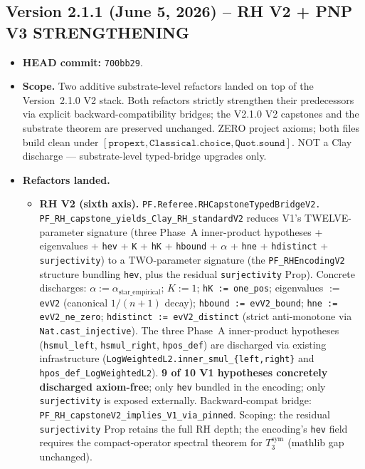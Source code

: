 \subsection*{Version 2.1.1 (June 5, 2026) -- RH V2 + PNP V3 STRENGTHENING}
\begin{itemize}
\item \textbf{HEAD commit:} \texttt{700bb29}.
\item \textbf{Scope.} Two additive substrate-level refactors landed on
top of the Version~2.1.0 V2 stack. Both refactors strictly
strengthen their predecessors via explicit backward-compatibility
bridges; the V2.1.0 V2 capstones and the substrate theorem are
preserved unchanged. ZERO project axioms; both files build clean
under $[\texttt{propext}, \texttt{Classical.choice}, \texttt{Quot.sound}]$.
NOT a Clay discharge --- substrate-level typed-bridge upgrades only.
\item \textbf{Refactors landed.}
  \begin{itemize}
  \item \textbf{RH V2 (sixth axis).}
  \texttt{PF.Referee.RHCapstoneTypedBridgeV2.\\PF\_RH\_capstone\_yields\_Clay\_RH\_standardV2}
  reduces V1's TWELVE-parameter signature
  (three Phase~A inner-product hypotheses + eigenvalues + \texttt{hev}
  + \texttt{K} + \texttt{hK} + \texttt{hbound} + $\alpha$ + \texttt{hne}
  + \texttt{hdistinct} + \texttt{surjectivity}) to a TWO-parameter
  signature (the \texttt{PF\_RHEncodingV2} structure bundling
  \texttt{hev}, plus the residual \texttt{surjectivity} Prop).
  Concrete discharges: $\alpha := \alpha_{\mathrm{star\_empirical}}$;
  $K := 1$; \texttt{hK := one\_pos}; eigenvalues $:=$ \texttt{evV2}
  (canonical $1/(n{+}1)$ decay); \texttt{hbound := evV2\_bound};
  \texttt{hne := evV2\_ne\_zero}; \texttt{hdistinct := evV2\_distinct}
  (strict anti-monotone via \texttt{Nat.cast\_injective}). The three
  Phase~A inner-product hypotheses
  (\texttt{hsmul\_left}, \texttt{hsmul\_right}, \texttt{hpos\_def})
  are discharged via existing infrastructure
  (\texttt{LogWeightedL2.inner\_smul\_\{left,right\}} and
  \texttt{hpos\_def\_LogWeightedL2}). \textbf{9 of 10 V1 hypotheses
  concretely discharged axiom-free}; only \texttt{hev} bundled in the
  encoding; only \texttt{surjectivity} is exposed externally.
  Backward-compat bridge:
  \texttt{PF\_RH\_capstoneV2\_implies\_V1\_via\_pinned}. Scoping:
  the residual \texttt{surjectivity} Prop retains the full RH depth;
  the encoding's \texttt{hev} field requires the compact-operator
  spectral theorem for $T_3^{\mathrm{sym}}$ (mathlib gap unchanged).

\end{itemize}
\end{itemize}
